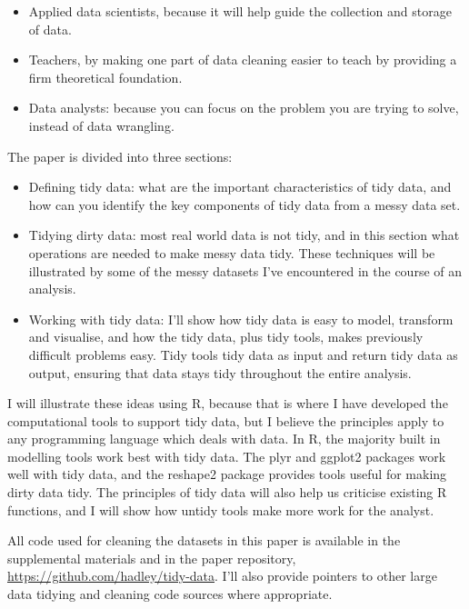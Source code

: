 \documentclass[oneside]{article}
\begin{document}
\begin{itemize}

\item Applied data scientists, because it will help guide the collection and storage of data.

\item Teachers, by making one part of data cleaning easier to teach by providing a firm theoretical foundation.

\item Data analysts: because you can focus on the problem you are trying to solve, instead of data wrangling.

\end{itemize}

The paper is divided into three sections:

\begin{itemize}

\item Defining tidy data: what are the important characteristics of tidy data, and how can you identify the key components of tidy data from a messy data set.

\item Tidying dirty data: most real world data is not tidy, and in this section what operations are needed to make messy data tidy. These techniques will be illustrated by some of the messy datasets I've encountered in the course of an analysis.

\item Working with tidy data: I'll show how tidy data is easy to model, transform and visualise, and how the tidy data, plus tidy tools, makes previously difficult problems easy. Tidy tools tidy data as input and return tidy data as output, ensuring that data stays tidy throughout the entire analysis.

\end{itemize}

I will illustrate these ideas using R, because that is where I have developed the computational tools to support tidy data, but I believe the principles apply to any programming language which deals with data. In R, the majority built in modelling tools work best with tidy data. The plyr and ggplot2 \citep{me:ggplot2} packages work well with tidy data, and the reshape2 package provides tools useful for making dirty data tidy. The principles of tidy data will also help us criticise existing R functions, and I will show how untidy tools make more work for the analyst.

All code used for cleaning the datasets in this paper is available in the supplemental materials and in the paper repository, \url{https://github.com/hadley/tidy-data}. I'll also provide pointers to other large data tidying and cleaning code sources where appropriate.
\end{document}
